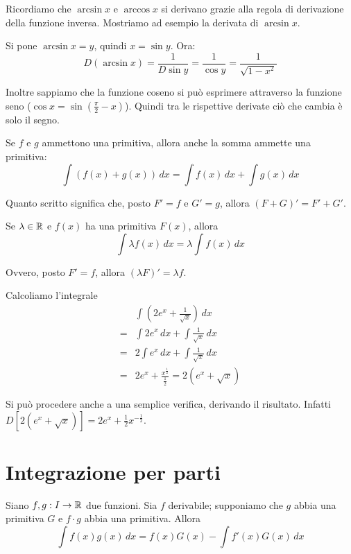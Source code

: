 Ricordiamo che $\arcsin	x$ e $\arccos x$ si derivano grazie alla regola di derivazione della funzione inversa. Mostriamo ad esempio la derivata di $\arcsin x$. 

Si pone $\arcsin x = y$, quindi $x = \sin y$. Ora:
\begin{equation*}
D(\arcsin x) = \frac{1}{D \sin y} = \frac{1}{\cos y} = \frac{1}{\sqrt{1-x^2}}
\end{equation*}

Inoltre sappiamo che la funzione coseno si può esprimere attraverso la funzione seno ($\cos x = \sin (\frac{\pi}{2} - x)$). Quindi tra le rispettive derivate ciò che cambia è solo il segno.

\begin{remark}
Se $f$ e $g$ ammettono una primitiva, allora anche la somma ammette una primitiva:
\begin{equation*}
\int (f(x)+g(x)) \, dx = \int f(x)\, dx + \int g(x)\, dx
\end{equation*}
\end{remark}

Quanto scritto significa che, posto $F' = f$ e $G' = g$, allora $(F+G)' = F'+G'$.

\begin{remark}
Se $\lambda \in \mathbb R$ e $f(x)$ ha una primitiva $F(x)$, allora
\begin{equation*}
\int \lambda f(x) \, dx = \lambda \int f(x)\, dx
\end{equation*}
\end{remark}
Ovvero, posto $F' = f$, allora $(\lambda F)' = \lambda f$.

\begin{example}
Calcoliamo l'integrale 
\begin{align*}
& \int (2e^x + \frac{1}{\sqrt{x}}) \, dx \\
= & \int 2e^x \, dx + \int \frac{1}{\sqrt{x}} \, dx \\
= & 2 \int e^x \, dx + \int \frac{1}{\sqrt{x}} \, dx \\
= & 2e^x + \frac{x^\frac{1}{2}}{\frac{1}{2}} = 2(e^x+\sqrt{x})
\end{align*}

Si può procedere anche a una semplice verifica, derivando il risultato. Infatti $D [2(e^x+\sqrt{x})] = 2e^x + \frac{1}{2}x^{-\frac{1}{2}}$.
\end{example}

\section{Integrazione per parti}
\begin{proposition}
Siano $f, g: I \to \mathbb R$ due funzioni. Sia $f$ derivabile; supponiamo che $g$ abbia una primitiva $G$ e $f \cdot g$ abbia una primitiva. Allora
\begin{equation*}
\int f(x)g(x) \, dx = f(x)G(x) - \int f'(x) G(x) \, dx
\end{equation*}
\end{proposition}

